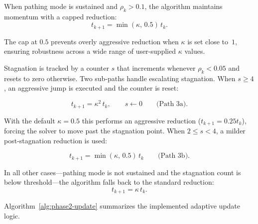 When pathing mode is sustained and $\rho_k > 0.1$, the algorithm maintains momentum with a capped reduction:
\begin{equation}
  t_{k+1} = \min(\kappa,\,0.5)\, t_k.
  \label{eq:fast}
\end{equation}

The cap at $0.5$ prevents overly aggressive reduction when $\kappa$ is set close to~$1$, ensuring robustness across a wide range of user-supplied $\kappa$ values.


Stagnation is tracked by a counter $s$ that increments whenever $\rho_k < 0.05$ and resets to zero otherwise. Two sub-paths handle escalating stagnation. When $s \ge 4$, an aggressive jump is executed and the counter is reset:

\begin{equation}
   t_{k+1} = \kappa^2\, t_k, \qquad s \gets 0 \qquad \text{(Path 3a)}.
  \label{eq:stagnation_jump}
\end{equation}

With the default $\kappa = 0.5$ this performs an aggressive reduction ($t_{k+1} = 0.25 t_k$), forcing the solver to move past the stagnation point. When $2 \le s < 4$, a milder post-stagnation reduction is used:

\begin{equation}
  t_{k+1} = \min(\kappa,\,0.5)\, t_k \qquad \text{(Path 3b)}.
  \label{eq:post_stagnation}
\end{equation}

In all other cases---pathing mode is not sustained and the stagnation count is below threshold---the algorithm falls back to the standard reduction:
\begin{equation}
  t_{k+1} = \kappa\, t_k.
  \label{eq:slow}
\end{equation}


Algorithm~\ref{alg:phase2-update} summarizes the implemented adaptive
update logic.


